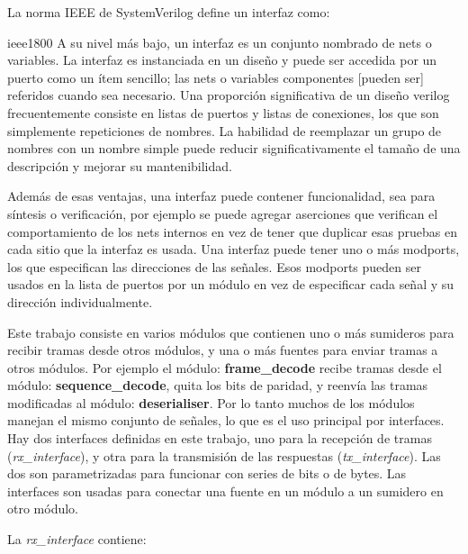 \documentclass[a4paper, twoside, 11pt]{report}
\begin{document}
La norma IEEE de SystemVerilog define un interfaz como:

\begin{displaycquote}[traducido de][]{ieee1800}
A su nivel más bajo, un interfaz es un conjunto nombrado de nets o variables. La interfaz es instanciada en un diseño y puede ser accedida por un puerto como un ítem sencillo; las nets o variables componentes [pueden ser] referidos cuando sea necesario. Una proporción significativa de un diseño verilog frecuentemente consiste en listas de puertos y listas de conexiones, los que son simplemente repeticiones de nombres. La habilidad de reemplazar un grupo de nombres con un nombre simple puede reducir significativamente el tamaño de una descripción y mejorar su mantenibilidad.
\end{displaycquote}

Además de esas ventajas, una interfaz puede contener funcionalidad, sea para síntesis o verificación, por ejemplo se puede agregar aserciones que verifican el comportamiento de los nets internos en vez de tener que duplicar esas pruebas en cada sitio que la interfaz es usada. Una interfaz puede tener uno o más modports, los que especifican las direcciones de las señales. Esos modports pueden ser usados en la lista de puertos por un módulo en vez de especificar cada señal y su dirección individualmente.

Este trabajo consiste en varios módulos que contienen uno o más sumideros para recibir tramas desde otros módulos, y una o más fuentes para enviar tramas a otros módulos. Por ejemplo el módulo: \textbf{frame\_decode} recibe tramas desde el módulo: \textbf{sequence\_decode}, quita los bits de paridad, y reenvía las tramas modificadas al módulo: \textbf{deserialiser}. Por lo tanto muchos de los módulos manejan el mismo conjunto de señales, lo que es el uso principal por interfaces. Hay dos interfaces definidas en este trabajo, uno para la recepción de tramas (\textit{rx\_interface}), y otra para la transmisión de las respuestas (\textit{tx\_interface}). Las dos son parametrizadas para funcionar con series de bits o de bytes. Las interfaces son usadas para conectar una fuente en un módulo a un sumidero en otro módulo.

La \textit{rx\_interface} contiene:
\end{document}
